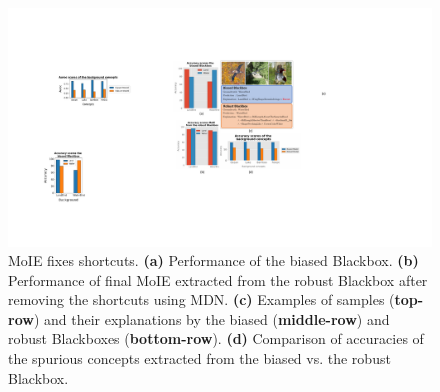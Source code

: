 \begin{figure}[ht]
\begin{center}
\centerline{\includegraphics[width=\columnwidth]{figures/main/shortcut.pdf}}
\caption{MoIE fixes shortcuts. \textbf{(a)} Performance of the biased Blackbox. 
\textbf{(b)} Performance of final MoIE extracted from the robust Blackbox after removing the shortcuts using MDN. 
\textbf{(c)} Examples of samples (\textbf{top-row}) and their explanations by the biased (\textbf{middle-row}) and robust Blackboxes (\textbf{bottom-row}). 
\textbf{(d)} Comparison of accuracies of the spurious concepts extracted from the biased vs. the robust Blackbox.
}
\label{fig:shortcut}
\end{center}
\vskip -0.2in
\end{figure}

